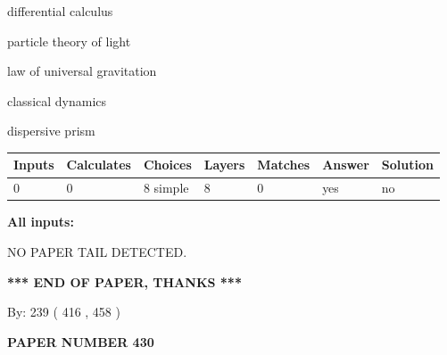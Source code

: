 \documentclass[12pt]{article}
\begin{document}
 
differential calculus
 
 
particle theory of light
 
 
law of universal gravitation
 
 
classical dynamics
 
 
dispersive prism
 
 
\noindent{}
 
 
   
   
   
   
\noindent\begin{tabular}{|l|l|l|l|l|l|l|}
 \hline
Inputs & Calculates & Choices & Layers & Matches & Answer & Solution \\ \hline
 0  & 
 0  & 
 8
  simple  
  & 
 8  & 
 0  & 
  yes & 
  no 
  \\ \hline
 \end{tabular}
   
   
   
   
\noindent{}
   
   
   
   
\noindent\vspace{0.1in}\hspace{-0.08in} {\textbf{\Large{All inputs: }}}
   
   
   
   
\vspace{2.0in} NO PAPER TAIL DETECTED.
   
   
   
   
\vspace{1.0in} 
{\textbf{\large{ *** END OF PAPER, THANKS *** }}} 
   
   
\hspace{1.0in} By: 
 239 ( 416 ,  458 )
   
   
   
   
\newpage 
\setcounter{page}{ 
   430001 } 
   
   
   
   
 {\textbf{ \Large{ PAPER NUMBER  430  }}}
   
   
\vspace{0.2in}
   
   
   
\end{document}
